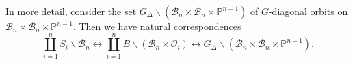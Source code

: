 \documentclass[12pt]{amsart}
\numberwithin{equation}{section}
\theoremstyle{remark}
\theoremstyle{definition}
\newcommand{\C}{\mbox{${\mathbb C}$}}
\newcommand{\B}{\mathcal{B}}
\begin{document}
  In more detail, consider the set $G_{\Delta}\backslash(\B_{n}\times\B_{n}\times\mathbb{P}^{n-1})$ of $G$-diagonal orbits on $\B_{n}\times\B_{n}\times\mathbb{P}^{n-1}.$ 
  Then we have natural correspondences
\begin{equation}\label{eq:allthecorres}
\coprod_{i=1}^{n} S_{i}\backslash\B_{n}\longleftrightarrow \coprod_{i=1}^{n} B\backslash (\B_{n}\times\mathcal{O}_{i})\longleftrightarrow G_{\Delta}\backslash(\B_{n}\times\B_{n}\times\mathbb{P}^{n-1}).
\end{equation}
\end{document}
